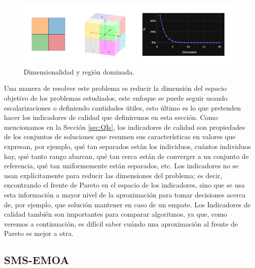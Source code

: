 \begin{figure}[H]
    \centering
    \includegraphics[width=\textwidth]{Figuras/maldicion_dimensionalidad.png}
    \caption[maldicion de la dimensionalidad]{Dimensionalidad y región dominada.}
    \label{fig:maldicion_dim}
\end{figure}

Una manera de resolver este problema es reducir la dimensión del espacio objetivo de los problemas estudiados, este enfoque se puede seguir usando escalarizaciones o definiendo cantidades útiles, esto último es lo que pretenden hacer los indicadores de calidad que definiremos en esta sección. Como mencionamos en la Sección \ref{sec:QIs}, los indicadores de calidad son propiedades de los conjuntos de soluciones que resumen sus características en valores que expresan, por ejemplo, qué tan separados están los individuos, cuántos individuos hay, qué tanto rango abarcan, qué tan cerca están de converger a un conjunto de referencia, qué tan uniformemente están separados, etc. Los indicadores no se usan explícitamente para reducir las dimensiones del problema; es decir, encontrando el frente de Pareto en el espacio de los indicadores, sino que se usa esta información a mayor nivel de la aproximación para tomar decisiones acerca de, por ejemplo, que solución mantener en caso de un empate. Los Indicadores de calidad también son importantes para comparar algoritmos, ya que, como veremos a continuación, es difícil saber cuándo una aproximación al frente de Pareto es mejor a otra. 

\subsection*{SMS-EMOA} \label{sec:SMS-EMOA}

